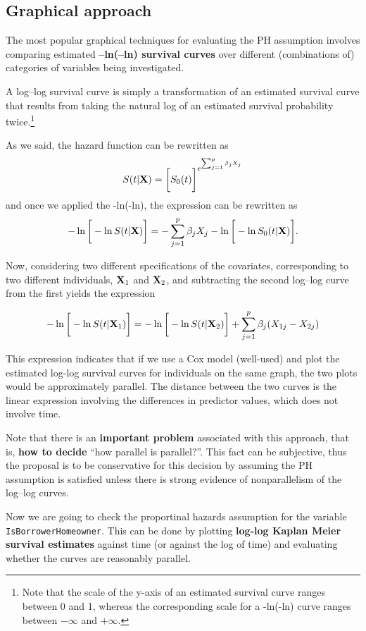 \documentclass[]{book}
\let\rmarkdownfootnote\footnote%
\def\footnote{\protect\rmarkdownfootnote}
\theoremstyle{definition}
\theoremstyle{definition}
\theoremstyle{definition}
\theoremstyle{remark}
\begin{document}
\subsection{Graphical approach}\label{graphical-approach}

The most popular graphical techniques for evaluating the PH assumption
involves comparing estimated \textbf{--ln(--ln) survival curves} over
different (combinations of) categories of variables being investigated.

A log--log survival curve is simply a transformation of an estimated
survival curve that results from taking the natural log of an estimated
survival probability twice.\footnote{Note that the scale of the y-axis
  of an estimated survival curve ranges between 0 and 1, whereas the
  corresponding scale for a -ln(-ln) curve ranges between \(-\infty\)
  and \(+\infty\).}

As we said, the hazard function can be rewritten as \[
S(t|\textbf X) = \bigg[ S_0(t) \bigg]^{e^{\sum_{j=1}^p \beta_j X_j}}
\] and once we applied the -ln(-ln), the expression can be rewritten as
\[
-\ln \bigg[-\ln S(t|\textbf X) \bigg] =  - \sum_{j=1}^p \beta_j X_j - \ln  \bigg[-\ln S_0(t|\textbf X) \bigg].  
\]

Now, considering two different specifications of the covariates,
corresponding to two different individuals, \(\textbf X_1\) and
\(\textbf X_2\), and subtracting the second log--log curve from the
first yields the expression

\[
-\ln \bigg[-\ln S(t|\textbf X_1) \bigg] = -\ln \bigg[-\ln S(t|\textbf X_2) \bigg] + \sum_{j=1}^p \beta_j (X_{1j} - X_{2j}) 
\]

This expression indicates that if we use a Cox model (well-used) and
plot the estimated log-log survival curves for individuals on the same
graph, the two plots would be approximately parallel. The distance
between the two curves is the linear expression involving the
differences in predictor values, which does not involve time.

Note that there is an \textbf{important problem} associated with this
approach, that is, \textbf{how to decide} ``how parallel is parallel?''.
This fact can be subjective, thus the proposal is to be conservative for
this decision by assuming the PH assumption is satisfied unless there is
strong evidence of nonparallelism of the log--log curves.

Now we are going to check the proportinal hazards assumption for the
variable \texttt{IsBorrowerHomeowner}. This can be done by plotting
\textbf{log-log Kaplan Meier survival estimates} against time (or
against the log of time) and evaluating whether the curves are
reasonably parallel.
\end{document}
